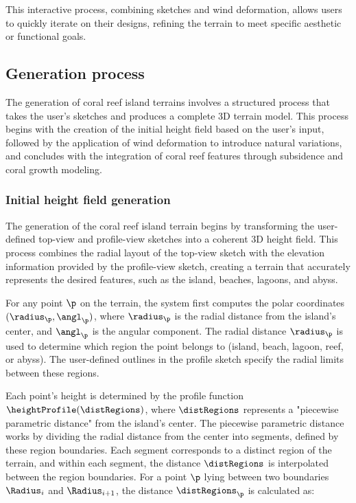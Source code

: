 This interactive process, combining sketches and wind deformation, allows users to quickly iterate on their designs, refining the terrain to meet specific aesthetic or functional goals.




\subsection{Generation process}
The generation of coral reef island terrains involves a structured process that takes the user's sketches and produces a complete 3D terrain model. This process begins with the creation of the initial height field based on the user's input, followed by the application of wind deformation to introduce natural variations, and concludes with the integration of coral reef features through subsidence and coral growth modeling.

\subsubsection{Initial height field generation}
The generation of the coral reef island terrain begins by transforming the user-defined top-view and profile-view sketches into a coherent 3D height field. This process combines the radial layout of the top-view sketch with the elevation information provided by the profile-view sketch, creating a terrain that accurately represents the desired features, such as the island, beaches, lagoons, and abyss.

For any point $\p$ on the terrain, the system first computes the polar coordinates $(\radius_\p, \angl_\p)$, where $\radius_\p$ is the radial distance from the island's center, and $\angl_\p$ is the angular component. The radial distance $\radius_\p$ is used to determine which region the point belongs to (island, beach, lagoon, reef, or abyss). The user-defined outlines in the profile sketch specify the radial limits between these regions.

Each point's height is determined by the profile function $\heightProfile(\distRegions)$, where $\distRegions$ represents a "piecewise parametric distance" from the island's center. The piecewise parametric distance works by dividing the radial distance from the center into segments, defined by these region boundaries. Each segment corresponds to a distinct region of the terrain, and within each segment, the distance $\distRegions$ is interpolated between the region boundaries. For a point $\p$ lying between two boundaries $\Radius_{i}$ and $\Radius_{i+1}$, the distance $\distRegions_\p$ is calculated as:

